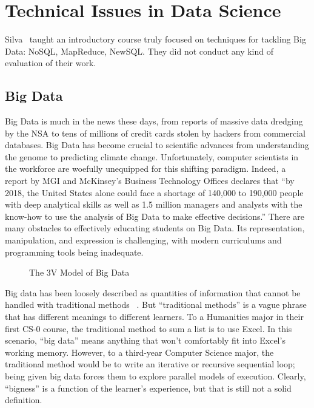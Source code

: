 \section{Technical Issues in Data Science}

Silva~\cite{Silva:2014} taught an introductory course truly focused on techniques for tackling Big Data: NoSQL, MapReduce, NewSQL. They did not conduct any kind of evaluation of their work. 

\subsection{Big Data}

Big Data is much in the news these days, from reports of massive data
dredging by the NSA to tens of millions of credit cards stolen by
hackers from commercial databases.
Big Data has become crucial to scientific advances from understanding the
genome to predicting climate change.
Unfortunately, computer scientists in the workforce are woefully
unequipped for this shifting paradigm.
Indeed, a report by MGI and McKinsey's Business Technology Offices
declares that ``by 2018, the United States alone could face a
shortage of 140,000 to 190,000 people with deep analytical skills as
well as 1.5 million managers and analysts with the know-how to use the
analysis of Big Data to make effective decisions.''\cite{McKinsey}
There are many obstacles to effectively educating students on Big
Data.
Its representation, manipulation, and expression is
challenging, with modern curriculums and programming tools being
inadequate.

\begin{wrapfigure}{r}{0.5\textwidth}
    \begin{center}
    \end{center}
    \vspace{-\bigskipamount}
    \caption{The 3V Model of Big Data}
    \label{fig-3v}
\end{wrapfigure}

Big data has been loosely described as quantities of information that cannot be handled with traditional methods ~\cite{McKinsey}.
But ``traditional methods'' is a vague phrase that has different meanings to different learners. To a Humanities major in their first CS-0 course, the traditional method to sum a list is to use Excel. In this scenario, ``big data'' means anything that won't comfortably fit into Excel's working memory.
However, to a third-year Computer Science major, the traditional method would be to write an iterative or recursive sequential loop; being given big data forces them to explore parallel models of execution.
Clearly, ``bigness'' is a function of the learner's experience, but that is still not a solid definition.


